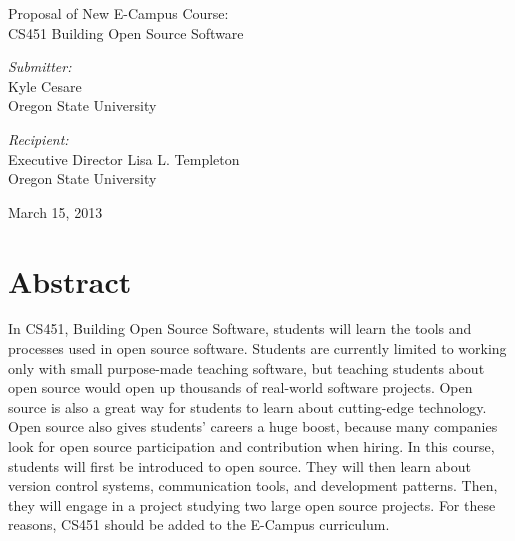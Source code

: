\documentclass[12pt,letterpaper]{article}
\begin{document}
\begin{titlepage}
  \begin{center}
    {\LARGE Proposal of New E-Campus Course:\\CS451 Building Open Source Software} \\[2cm]

    \begin{minipage}{0.4\textwidth}
      \begin{flushleft}
        \emph{Submitter:} \\
        Kyle Cesare \\
        Oregon State University \\
      \end{flushleft}
    \end{minipage}
    \begin{minipage}{0.4\textwidth}
      \begin{flushleft}
        \emph{Recipient:} \\
        Executive Director Lisa L. Templeton \\
        Oregon State University \\
      \end{flushleft}
    \end{minipage}

    \vfill

    March 15, 2013

  \end{center}
\end{titlepage}

\pagestyle{myheadings}
\setcounter{page}{2}

\setcounter{secnumdepth}{0}

\section{Abstract}
In CS451, Building Open Source Software, students will learn the tools and
processes used in open source software.  Students are currently limited to
working only with small purpose-made teaching software, but teaching students
about open source would open up thousands of real-world software projects.  Open
source is also a great way for students to learn about cutting-edge technology.
Open source also gives students' careers a huge boost, because many companies
look for open source participation and contribution when hiring.  In this
course, students will first be introduced to open source.  They will then learn
about version control systems, communication tools, and development patterns.
Then, they will engage in a project studying two large open source projects.
For these reasons, CS451 should be added to the E-Campus curriculum.
\end{document}
